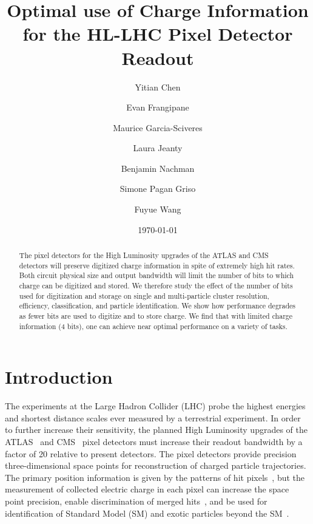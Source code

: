 \documentclass[12pt]{article}
\date{\today}
\begin{document}
\title{Optimal use of Charge Information for the HL-LHC Pixel Detector Readout}
\author[1,2,3]{Yitian Chen}
\author[1,3]{Evan Frangipane}
\author[3]{Maurice Garcia-Sciveres}
\author[3]{Laura Jeanty}
\author[3]{Benjamin Nachman}
\author[3]{Simone Pagan Griso}
\author[3,4]{Fuyue Wang}

\maketitle

\begin{abstract}
The pixel detectors for the High Luminosity upgrades of the ATLAS and CMS detectors will preserve digitized
charge information in spite of extremely high hit rates. Both circuit physical size and output bandwidth 
will limit the number of bits to which charge can be digitized and stored. We therefore study the 
effect of the number of bits used for digitization and storage on  single and multi-particle cluster resolution, 
efficiency, classification, and particle identification.
We show how performance degrades as fewer bits are used to digitize and to store charge. 
We find that with limited charge information (4 bits), one can achieve near optimal performance on a variety of tasks.  
\end{abstract}

\section{Introduction}
\label{sec:intro}

The experiments at the Large Hadron Collider (LHC) probe the highest energies and shortest distance scales ever measured by a terrestrial experiment. In order to further increase their sensitivity, 
the planned High Luminosity upgrades of the ATLAS~\cite{CERN-LHCC-2015-020} and CMS~\cite{Butler:2055167} pixel detectors must 
increase their readout bandwidth by a factor of 20 relative to present detectors. 
The pixel detectors provide precision three-dimensional space points for reconstruction of charged particle trajectories.
The primary position information is given by the patterns of hit pixels~\cite{binaryreadout},
but the measurement of collected electric charge in each pixel can increase the space point precision,
enable discrimination of merged hits~\cite{Aad:2014yva,Aaboud:2017all,cmsjetcore}, and be used for identification of Standard Model (SM) and 
exotic particles beyond the SM~\cite{Aaboud:2016dgf,Khachatryan:2016sfv,ATLAS:2014fka,Chatrchyan:2013oca,Aad:2011yf,Aad:2012pra,Aad:2013pqd,Chatrchyan:2012sp,Khachatryan:2011ts}.  
\end{document}
